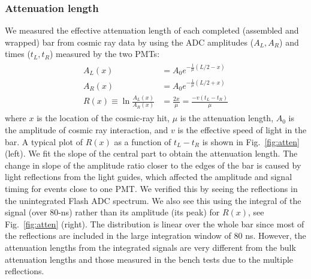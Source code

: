 \documentclass[review,number,sort&compress]{elsarticle}
\begin{document}
\subsubsection{Attenuation length \label{attenlen}}
We measured the effective attenuation length of each completed
(assembled and wrapped) bar from cosmic ray data by using the ADC
amplitudes ($A_L,A_R$) and times ($t_L,t_R$) measured by the two PMTs:
\begin{eqnarray}
	\begin{split}
		A_L(x) &= A_0 e^{-\frac{1}{\mu}\left(L/2-x\right) }				\\
		A_R(x) &= A_0 e^{-\frac{1}{\mu}\left(L/2+x\right) }				\\
		R(x) \equiv \ln{\frac{A_L(x)}{A_R(x)}} &= \frac{2x}{\mu} = \frac{-v(t_{L}-t_{R})}{\mu}			
		 \label{eqn:atten}
	\end{split}
\end{eqnarray}
where $x$ is the location of the cosmic-ray hit, $\mu$ is the
attenuation length, $A_0$ is the amplitude of cosmic ray interaction,
and $v$ is the effective speed of light in the bar.  A typical plot of
$R(x)$ as a function of $t_{L}-t_{R}$ is shown in Fig.~\ref{fig:atten}
(left).  We fit the slope of the central part to obtain the
attenuation length.  The change in slope of the amplitude ratio closer
to the edges of the bar is caused by light reflections from the light
guides, which affected the amplitude and signal timing for events close to one
PMT. We verified this by seeing the reflections in the unintegrated
Flash ADC spectrum.  We also see this using the integral of the signal (over
80-ns) rather than
its amplitude (its peak) for $R(x)$, see Fig.~\ref{fig:atten} (right). The
distribution is linear over the whole bar since most of
the reflections are included in the large integration window of 80
\si{\nano\s}. However, the attenuation lengths from the integrated
signals are very different from the bulk attenuation lengths and those
measured in the bench tests due to the multiple reflections.
\end{document}
